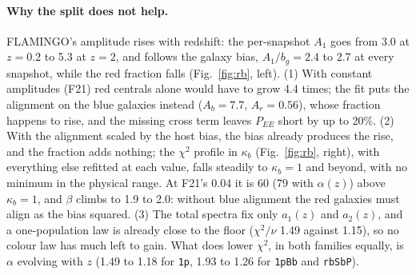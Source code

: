\documentclass[11pt]{article}
\begin{document}
\paragraph{Why the split does not help.} FLAMINGO's amplitude rises with
redshift: the per-snapshot $A_1$ goes from 3.0 at $z = 0.2$ to 5.3 at $z = 2$,
and follows the galaxy bias, $A_1/b_g = 2.4$ to 2.7 at every snapshot, while
the red fraction falls (Fig.~\ref{fig:rb}, left). (1) With constant amplitudes
(F21) red centrals alone would have to grow 4.4 times; the fit puts the
alignment on the blue galaxies instead ($A_b = 7.7$, $A_r = 0.56$), whose
fraction happens to rise, and the missing cross term leaves $P_{EE}$ short by
up to 20\%. (2) With the alignment scaled by the host bias, the bias already
produces the rise, and the fraction adds nothing; the $\chi^2$ profile in
$\kappa_b$ (Fig.~\ref{fig:rb}, right), with everything else refitted at each
value, falls steadily to $\kappa_b = 1$ and beyond, with no minimum in the
physical range. At F21's 0.04 it is 60 (79 with $\alpha(z)$) above
$\kappa_b = 1$, and $\beta$ climbs to 1.9 to 2.0: without blue alignment the
red galaxies must align as the bias squared. (3) The total spectra fix only
$a_1(z)$ and $a_2(z)$, and a one-population law is already close to the
floor ($\chi^2/\nu$ 1.49 against 1.15), so no colour law has much left to
gain. What does lower $\chi^2$, in both families equally, is $\alpha$
evolving with $z$ (1.49 to 1.18 for \texttt{1p}, 1.93 to 1.26 for
\texttt{1pBb} and \texttt{rbSbP}).
\end{document}
